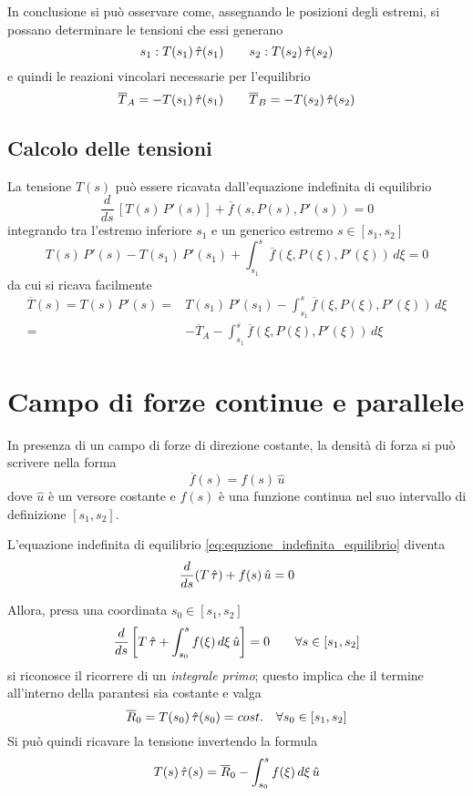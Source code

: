 In conclusione si può osservare come, assegnando le posizioni degli estremi, si possano determinare le tensioni che essi generano
\[
s_1: T(s_1)\,\hat{\tau}(s_1)\qquad s_2: T(s_2)\,\hat{\tau}(s_2)
\]
e quindi le reazioni vincolari necessarie per l'equilibrio
\[
\overline{T}_A = -	T(s_1)\,\hat{\tau}(s_1)\qquad \overline{T}_B = -T(s_2)\,\hat{\tau}(s_2)
\]

\subsection{Calcolo delle tensioni}
La tensione $T(s)$ può essere ricavata dall'equazione indefinita di equilibrio 
\[
\dfrac{d}{ds}\,\left[T(s)\,P'(s)\right] + \overline{f}(s, P(s), P'(s)) = 0
\] 
integrando tra l'estremo inferiore $s_1$ e un generico estremo $s \in [s_1, s_2]$
\[
T(s)\,P'(s) - T(s_1)\,P'(s_1) + \int_{s_1}^s \overline{f}(\xi, P(\xi), P'(\xi))\,d\xi = 0
\]
da cui si ricava facilmente
\begin{align*}
\overline{T}	(s) = T(s)\,P'(s) =& T(s_1)\,P'(s_1) - \int_{s_1}^s \overline{f}(\xi, P(\xi), P'(\xi))\,d\xi\\
=& - \overline{T}_A - \int_{s_1}^s \overline{f}(\xi, P(\xi), P'(\xi))\,d\xi 
\end{align*}



\section{Campo di forze continue e parallele}\label{section:forze_continue_parallele}
In presenza di un campo di forze di direzione costante, la densità di forza si può scrivere nella forma
\[
\overline{f}(s)	= f(s)\,\hat{u}
\]
dove $\hat{u}$ è un versore costante e $f(s)$ è una funzione continua nel suo intervallo di definizione $[s_1, s_2]$.

L'equazione indefinita di equilibrio \eqref{eq:equzione_indefinita_equilibrio} diventa
\[
\dfrac{d}{ds}	(T\,\hat{\tau}) + f(s)\,\hat{u} = 0
\]

Allora, presa una coordinata $s_0 \in[s_1, s_2]$ 
\[
\dfrac{d}{ds}	\left[ T\,\hat{\tau} + \int_{s_0}^s f(\xi)\,d\xi\,\hat{u}\right] = 0\qquad \forall s\in[s_1, s_2]
\]
si riconosce il ricorrere di un \emph{integrale primo}; questo implica che il termine all'interno della parantesi sia costante e valga
\[
\overline{R}_0 = T(s_0)	\,\hat{\tau}(s_0) = cost.\quad \forall s_0 \in[s_1, s_2]
\]
 Si può quindi ricavare la tensione invertendo la formula
 \[
T(s)\,\hat{\tau}(s) = \overline{R}_0 - \int_{s_0}^s f(\xi)\,d\xi\,\hat{u}	 
 \]
 
